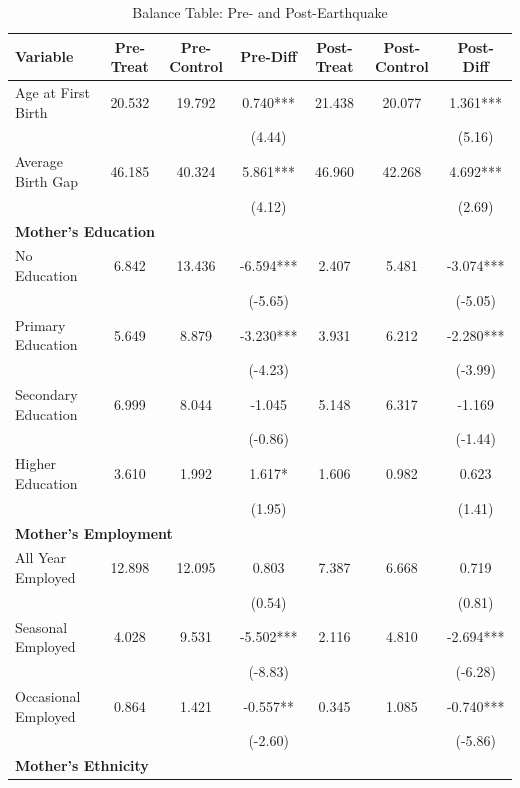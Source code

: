 \begin{table}[htbp]
\centering
\scriptsize
\caption{Balance Table: Pre- and Post-Earthquake}
\begin{tabular}{lcccccc}
\toprule
Variable & Pre-Treat & Pre-Control & Pre-Diff & Post-Treat & Post-Control & Post-Diff \\
\midrule
Age at First Birth & 20.532 & 19.792 & 0.740*** & 21.438 & 20.077 & 1.361*** \\
 & & & (4.44) & & & (5.16) \\
Average Birth Gap & 46.185 & 40.324 & 5.861*** & 46.960 & 42.268 & 4.692*** \\
 & & & (4.12) & & & (2.69) \\
\multicolumn{7}{l}{\textbf{Mother's Education}} \\
\hspace{0.2in}No Education & 6.842 & 13.436 & -6.594*** & 2.407 & 5.481 & -3.074*** \\
 & & & (-5.65) & & & (-5.05) \\
\hspace{0.2in}Primary Education & 5.649 & 8.879 & -3.230*** & 3.931 & 6.212 & -2.280*** \\
 & & & (-4.23) & & & (-3.99) \\
\hspace{0.2in}Secondary Education & 6.999 & 8.044 & -1.045 & 5.148 & 6.317 & -1.169 \\
 & & & (-0.86) & & & (-1.44) \\
\hspace{0.2in}Higher Education & 3.610 & 1.992 & 1.617* & 1.606 & 0.982 & 0.623 \\
 & & & (1.95) & & & (1.41) \\
\multicolumn{7}{l}{\textbf{Mother's Employment}} \\
\hspace{0.2in}All Year Employed & 12.898 & 12.095 & 0.803 & 7.387 & 6.668 & 0.719 \\
 & & & (0.54) & & & (0.81) \\
\hspace{0.2in}Seasonal Employed & 4.028 & 9.531 & -5.502*** & 2.116 & 4.810 & -2.694*** \\
 & & & (-8.83) & & & (-6.28) \\
\hspace{0.2in}Occasional Employed & 0.864 & 1.421 & -0.557** & 0.345 & 1.085 & -0.740*** \\
 & & & (-2.60) & & & (-5.86) \\
\multicolumn{7}{l}{\textbf{Mother's Ethnicity}} \\

\end{tabular}
\end{table}
